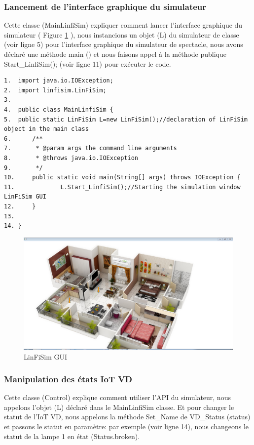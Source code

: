\subsubsection{Lancement de l'interface graphique du simulateur}
Cette classe (MainLinfiSim) expliquer comment lancer l'interface graphique du simulateur
( Figure \ref{fc20} ), nous instancions un objet (L) du simulateur de classe (voir ligne 5) pour l'interface graphique du simulateur de spectacle, nous avons déclaré une méthode main () et nous faisons appel à la méthode publique Start\_LinfiSim(); (voir ligne 11) pour exécuter le code.
\begin{lstlisting}
1.	import java.io.IOException;
2.	import linfisim.LinFiSim;
3.	
4.	public class MainLinfiSim {
5.	public static LinFiSim L=new LinFiSim();//declaration of LinFiSim object in the main class
6.	    /**
7.	     * @param args the command line arguments
8.	     * @throws java.io.IOException
9.	     */
10.	    public static void main(String[] args) throws IOException {
11.	            L.Start_LinfiSim();//Starting the simulation window LinFiSim GUI
12.	    }
13.	    
14.	}
\end{lstlisting}


\begin{figure}[H]
    \centering
    \includegraphics[scale=0.4]{chap1/fc20.png}
    \caption{LinFiSim GUI}
    \label{fc20}
\end{figure}
\subsubsection{Manipulation des états IoT VD}
Cette classe (Control) explique comment utiliser l'API du simulateur, nous appelons l'objet (L) déclaré dans le MainLinfiSim classe. Et pour changer le statut de l'IoT VD, nous appelons la méthode Set\_Name de VD\_Status (status) et passons le statut en paramètre: par exemple (voir ligne 14), nous changeons le statut de la lampe 1 en état (Status.broken). 


